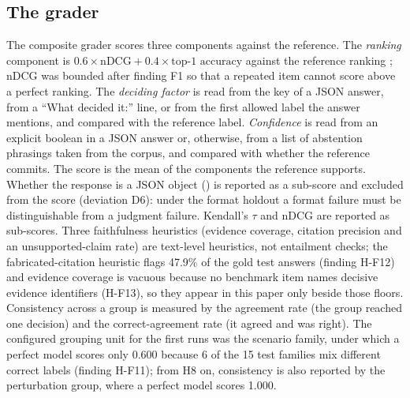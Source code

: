 \subsection{The grader}
The composite grader  scores three components against the reference. The \emph{ranking} component is $0.6 \times \text{nDCG} + 0.4 \times \text{top-1 accuracy}$ against the reference ranking \citep{jarvelin2002ndcg}; nDCG was bounded after finding F1 so that a repeated item cannot score above a perfect ranking. The \emph{deciding factor} is read from the  key of a JSON answer, from a ``What decided it:'' line, or from the first allowed label the answer mentions, and compared with the reference label. \emph{Confidence} is read from an explicit boolean in a JSON answer or, otherwise, from a list of abstention phrasings taken from the \kleos{} corpus, and compared with whether the reference commits. The score is the mean of the components the reference supports. Whether the response is a JSON object () is reported as a sub-score and excluded from the score (deviation D6): under the format holdout a format failure must be distinguishable from a judgment failure. Kendall's $\tau$ \citep{kendall1938tau} and nDCG are reported as sub-scores. Three faithfulness heuristics (evidence coverage, citation precision and an unsupported-claim rate) are text-level heuristics, not entailment checks; the fabricated-citation heuristic flags 47.9\% of the gold test answers (finding H-F12) and evidence coverage is vacuous because no benchmark item names decisive evidence identifiers (H-F13), so they appear in this paper only beside those floors. Consistency across a group is measured by the agreement rate (the group reached one decision) and the correct-agreement rate (it agreed and was right). The configured grouping unit for the first runs was the scenario family, under which a perfect model scores only 0.600 because 6 of the 15 test families mix different correct labels (finding H-F11); from H8 on, consistency is also reported by the perturbation group, where a perfect model scores 1.000.

